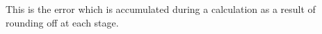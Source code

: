This is the error which is accumulated during a calculation as a result
of rounding off at each stage.